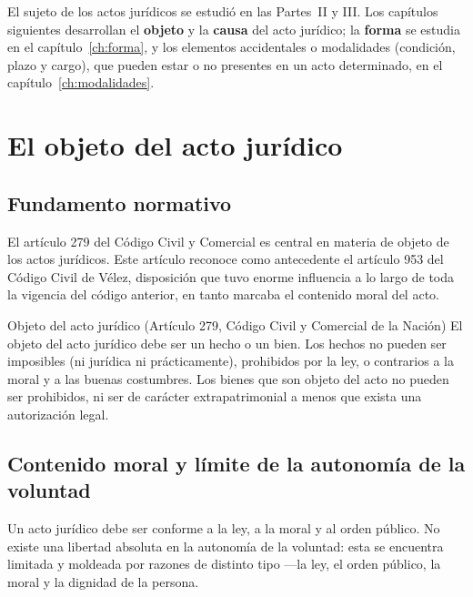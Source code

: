 \documentclass[12pt,oneside]{book}
\begin{document}

El sujeto de los actos jurídicos se estudió en las Partes~II y III. Los capítulos siguientes desarrollan el \textbf{objeto} y la \textbf{causa} del acto jurídico; la \textbf{forma} se estudia en el capítulo~\ref{ch:forma}, y los elementos accidentales o modalidades (condición, plazo y cargo), que pueden estar o no presentes en un acto determinado, en el capítulo~\ref{ch:modalidades}.
\chapter{El objeto del acto jurídico}

\section{Fundamento normativo}

El artículo 279 del Código Civil y Comercial es central en materia de objeto de los actos jurídicos. Este artículo reconoce como antecedente el artículo 953 del Código Civil de Vélez, disposición que tuvo enorme influencia a lo largo de toda la vigencia del código anterior, en tanto marcaba el contenido moral del acto.

\begin{definition}{Objeto del acto jurídico (Artículo 279, Código Civil y Comercial de la Nación)}
El objeto del acto jurídico debe ser un hecho o un bien. Los hechos no pueden ser imposibles (ni jurídica ni prácticamente), prohibidos por la ley, o contrarios a la moral y a las buenas costumbres. Los bienes que son objeto del acto no pueden ser prohibidos, ni ser de carácter extrapatrimonial a menos que exista una autorización legal.
\end{definition}

\section{Contenido moral y límite de la autonomía de la voluntad}

Un acto jurídico debe ser conforme a la ley, a la moral y al orden público. No existe una libertad absoluta en la autonomía de la voluntad: esta se encuentra limitada y moldeada por razones de distinto tipo —la ley, el orden público, la moral y la dignidad de la persona.
\end{document}
